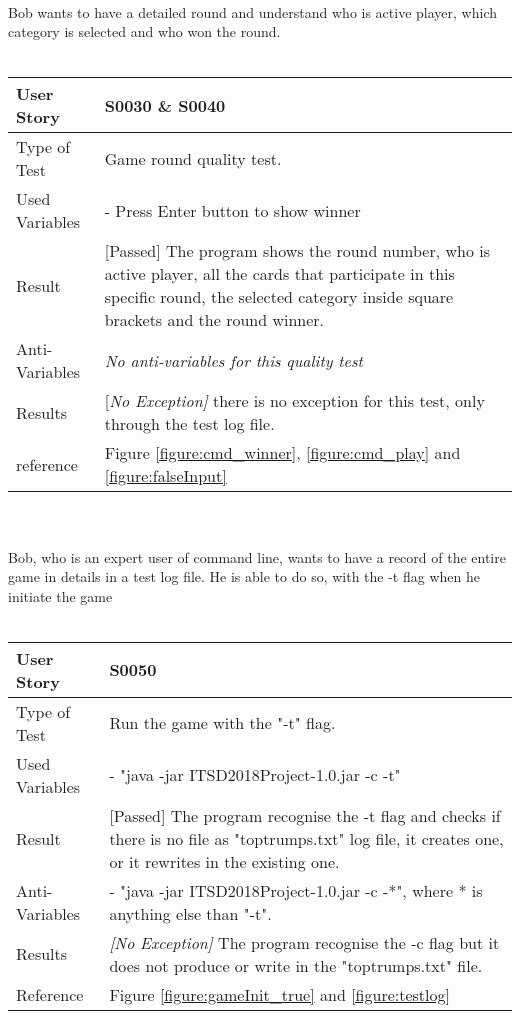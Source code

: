 \vspace{0.2cm}\\
Bob wants to have a detailed round and understand who is active player, which category is selected and who won the round.\\
\vspace{0.2cm}\\
\begin{tabular}{l | p{12cm}}
User Story & \textbf{S0030} \& \textbf{S0040} \\ \hline
Type of Test & Game round quality test.\\ \hline
Used Variables & - Press Enter button to show winner\\ \hline
Result & [Passed] The program shows the round number, who is active player, all the cards that participate in this specific round, the selected category inside square brackets and the round winner.\\ \hline
Anti-Variables & \textit{No anti-variables for this quality test} \\ \hline
Results & [\textit{No Exception]} there is no exception for this test, only through the test log file. \\ \hline
reference & Figure \ref{figure:cmd_winner}, \ref{figure:cmd_play} and \ref{figure:falseInput}
\\ \hline
\end{tabular}\\
\vspace{0.2cm}\\
Bob, who is an expert user of command line, wants to have a record of the entire game in details in a test log file. He is able to do so, with the -t flag when he initiate the game\\
\vspace{0.2cm}\\
\begin{tabular}{l | p{12cm}}
User Story & \textbf{S0050}\\ \hline
Type of Test & Run the game with the "-t" flag.\\ \hline
Used Variables & - "java -jar ITSD2018Project-1.0.jar -c -t"\\ \hline
Result & [Passed] The program recognise the -t flag and checks if there is no file as "toptrumps.txt" log file, it creates one, or it rewrites in the existing one.\\ \hline
Anti-Variables & - "java -jar ITSD2018Project-1.0.jar -c -*", where * is anything else than "-t".\\ \hline
Results & \textit{[No Exception]} The program recognise the -c flag but it does not produce or write in the "toptrumps.txt" file. \\ \hline
Reference & Figure \ref{figure:gameInit_true} and \ref{figure:testlog}\\ \hline
\end{tabular}\\
